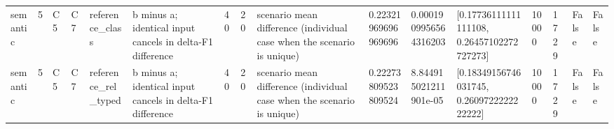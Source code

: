 \begin{tabular}{llllllllllllllll}
semantic & 5 & C5 & C7 & reference\_class & b minus a; identical input cancels in delta-F1 difference & 40 & 20 & scenario mean difference (individual case when the scenario is unique) & 0.22321969696969696 & 0.0001909956564316203 & [0.17736111111111108, 0.26457102272727273] & 10000 & 1729 & False & False \\
semantic & 5 & C5 & C7 & reference\_rel\_typed & b minus a; identical input cancels in delta-F1 difference & 40 & 20 & scenario mean difference (individual case when the scenario is unique) & 0.22273809523809524 & 8.844915021211901e-05 & [0.18349156746031745, 0.2609722222222222] & 10000 & 1729 & False & False \\
\end{tabular}